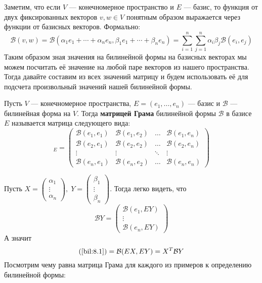 \documentclass[../main.tex]{subfiles}
\begin{document}
Заметим, что если $V$ --- конечномерное пространство и $E$ --- базис, то функция от двух фиксированных векторов $v, w \in V$ понятным образом выражается через функции от базисных векторов. Формально:
\begin{equation}
\label{bil:8.1}
\tag{*}
  \mathcal{B}(v, w) =
  \mathcal{B}(\alpha_1 e_1 + \dotsb + \alpha_n e_n, \beta_1 e_1 + \dotsb + \beta_n e_n) =
  \sum\limits_{i = 1}^{n} \sum\limits_{j = 1}^{n} \alpha_i \beta_j \mathcal{B}(e_i, e_j)
\end{equation}
Таким образом зная значения на билинейной формы на базисных векторах мы можем посчитать её значение на любой паре векторов из нашего пространства. Тогда давайте составим из всех значений матрицу и будем использовать её для подсчета произвольный значений нашей билинейной формы.

\begin{definition}
  Пусть $V$ --- конечномерное пространства, $E = (e_1, \dotsc, e_n)$ --- базис и $\mathcal{B}$ --- билинейная форма на $V$. Тогда \textbf{матрицей Грама} билинейной формы $\mathcal{B}$ в базисе $E$ называется матрица следующего вида:
  \begin{equation*}
    [\mathcal{B}]_E =
    \begin{pmatrix}
      \mathcal{B}(e_1, e_1) & \mathcal{B}(e_1, e_2) & \hdots & \mathcal{B}(e_1, e_n) \\
      \mathcal{B}(e_2, e_1) & \mathcal{B}(e_2, e_2) & \hdots & \mathcal{B}(e_2, e_n) \\
      \vdots & \vdots & \ddots & \vdots \\
      \mathcal{B}(e_n, e_1) & \mathcal{B}(e_n, e_2) & \hdots & \mathcal{B}(e_n, e_n)
    \end{pmatrix}
  \end{equation*}
\end{definition}

Пусть $X =
\begin{pmatrix}
  \alpha_1 \\
  \vdots \\
  \alpha_n
\end{pmatrix},\;
Y =
\begin{pmatrix}
  \beta_1 \\
  \vdots \\
  \beta_n
\end{pmatrix}$. Тогда легко видеть, что
\begin{equation*}
  \mathcal{B}Y =
  \begin{pmatrix}
    \mathcal{B}(e_1, EY) \\
    \vdots \\
    \mathcal{B}(e_n, EY)
  \end{pmatrix}
\end{equation*}
А значит
\begin{equation*}
  \text{(\ref{bil:8.1})} = \mathcal{B}(EX, EY) = X^T \mathcal{B} Y
\end{equation*}
Посмотрим чему равна матрица Грама для каждого из примеров к определению билинейной формы:
\end{document}
